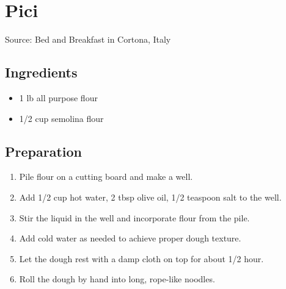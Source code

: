 \section{Pici}

\begin{center}
Source: Bed and Breakfast in Cortona, Italy
\end{center}

\subsection{Ingredients}
\begin{itemize}
    \item 1 lb all purpose flour
    \item 1/2 cup semolina flour
\end{itemize}

\subsection{Preparation}
\begin{enumerate}
    \item Pile flour on a cutting board and make a well.
    \item Add 1/2 cup hot water, 2 tbsp olive oil, 1/2 teaspoon salt to the well.
    \item Stir the liquid in the well and incorporate flour from the pile.
    \item Add cold water as needed to achieve proper dough texture.
    \item Let the dough rest with a damp cloth on top for about 1/2 hour.
    \item Roll the dough by hand into long, rope-like noodles.
\end{enumerate}
